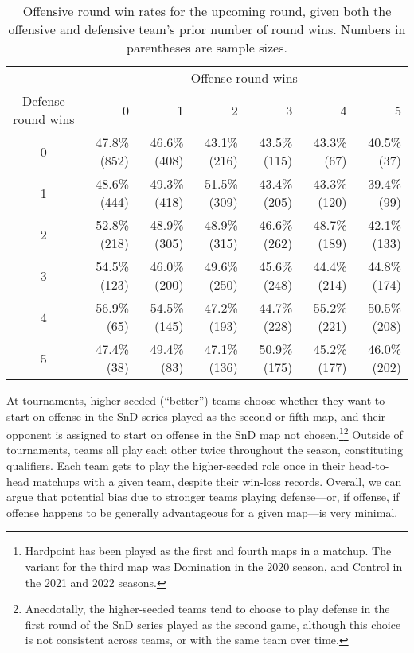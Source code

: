 \documentclass{article}
\begin{document}
\begin{table}

\caption{Offensive round win rates for the upcoming round, given both the offensive and defensive team's prior number of round wins. Numbers in parentheses are sample sizes.}

\centering
\begin{tabular}{crrrrrr}
\toprule
& \multicolumn{6}{c}{Offense round wins} \\ 
\cmidrule(lr){2-7}
Defense round wins & 0 & 1 & 2 & 3 & 4 & 5 \\ 
\midrule

0 & 47.8\%(852) & 46.6\%(408) & 43.1\%(216) & 43.5\%(115) & 43.3\%(67)  & 40.5\%(37)  \\
1 & 48.6\%(444) & 49.3\%(418) & 51.5\%(309) & 43.4\%(205) & 43.3\%(120) & 39.4\%(99)  \\
2 & 52.8\%(218) & 48.9\%(305) & 48.9\%(315) & 46.6\%(262) & 48.7\%(189) & 42.1\%(133) \\
3 & 54.5\%(123) & 46.0\%(200) & 49.6\%(250) & 45.6\%(248) & 44.4\%(214) & 44.8\%(174) \\
4 & 56.9\%(65)  & 54.5\%(145) & 47.2\%(193) & 44.7\%(228) & 55.2\%(221) & 50.5\%(208) \\
5 & 47.4\%(38)  & 49.4\%(83)  & 47.1\%(136) & 50.9\%(175) & 45.2\%(177) & 46.0\%(202) \\

\bottomrule
\end{tabular}

\label{tbl:o-win-prop-by-series-state}

\end{table}

At tournaments, higher-seeded (``better'') teams choose whether they
want to start on offense in the SnD series played as the second or fifth
map, and their opponent is assigned to start on offense in the SnD map
not chosen.\footnote{Hardpoint has been played as the first and fourth
  maps in a matchup. The variant for the third map was Domination in the
  2020 season, and Control in the 2021 and 2022 seasons.}\footnote{Anecdotally,
  the higher-seeded teams tend to choose to play defense in the first
  round of the SnD series played as the second game, although this
  choice is not consistent across teams, or with the same team over
  time.} Outside of tournaments, teams all play each other twice
throughout the season, constituting qualifiers. Each team gets to play
the higher-seeded role once in their head-to-head matchups with a given
team, despite their win-loss records. Overall, we can argue that
potential bias due to stronger teams playing defense---or, if offense,
if offense happens to be generally advantageous for a given map---is
very minimal.
\end{document}
